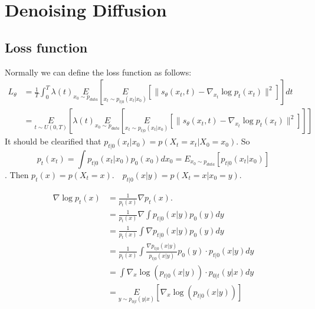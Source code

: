 \documentclass{article}
\begin{document}
\section{Denoising Diffusion}
\subsection{Loss function}
Normally we can define the loss function as follows:
\begin{equation}
    \begin{aligned}
        L_\theta & = \frac{1}{T}\int_0^T\lambda(t)\underset{x_0\sim p_{data}}{E}\left[\underset{x_t\sim p_{t|0}(x_t|x_0)}{E}\left[\|s_\theta(x_t, t)-\nabla_{x_t}\log p_t(x_t)\|^2\right]\right]dt\\
        &=\underset{t\sim U(0, T)}{E}\left[\lambda(t)\underset{x_0\sim p_{data}}{E}\left[\underset{x_t\sim p_{t|0}(x_t|x_0)}{E}\left[\|s_\theta(x_t, t)-\nabla_{x_t}\log p_t(x_t)\|^2\right]\right]\right]
    \end{aligned}
\end{equation}
It should be clearified that $p_{t|0}(x_t|x_0)=p(X_t=x_t|X_0=x_0)$. So $$p_t(x_t)=\int p_{t|0}(x_t|x_0)p_0(x_0)dx_0=E_{x_0\sim p_{data}}\left[p_{t|0}(x_t|x_0)\right]$$.
Then $p_{t}(x)=p\left(X_{t}=x\right) . \quad p_{t | 0}(x | y)=p\left(X_{t}=x | x_{0}=y\right)$.

\begin{equation}
    \begin{aligned}
    \nabla \log p_{t}(x) & =\frac{1}{p_{t}(x)} \nabla p_{t}(x) . \\
    & =\frac{1}{p_{t}(x)} \nabla \int p_{t | 0}(x | y) p_{0}(y) d y \\
    & =\frac{1}{p_{t}(x)} \int \nabla p_{t | 0}(x | y) p_{0}(y) d y \\
    & =\frac{1}{p_{t}(x)} \int \frac{\nabla p_{t | 0}(x | y)}{p_{t | 0}(x | y)} p_{0}(y) \cdot p_{t | 0}(x | y) d y \\
    & =\int \nabla_{x} \log \left(p_{t | 0}(x | y)\right) \cdot p_{0 | t}(y | x) d y \\
    & =\underset{y\sim p_{0|t}(y|x)}{E}\left[\nabla_{x} \log \left(p_{t | 0}(x | y)\right)\right]
    \end{aligned}
\end{equation}
\end{document}
